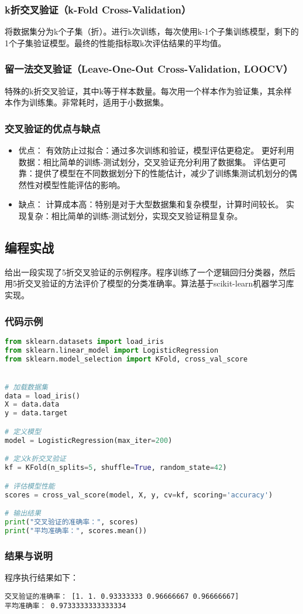 \subsubsection{k折交叉验证（k-Fold Cross-Validation）}

将数据集分为k个子集（折）。进行k次训练，每次使用k-1个子集训练模型，剩下的1个子集验证模型。最终的性能指标取k次评估结果的平均值。

\subsubsection{留一法交叉验证（Leave-One-Out Cross-Validation, LOOCV）}

特殊的k折交叉验证，其中k等于样本数量。每次用一个样本作为验证集，其余样本作为训练集。非常耗时，适用于小数据集。

\subsubsection{交叉验证的优点与缺点}
\begin{itemize}
\item 优点：
有效防止过拟合：通过多次训练和验证，模型评估更稳定。
更好利用数据：相比简单的训练-测试划分，交叉验证充分利用了数据集。
评估更可靠：提供了模型在不同数据划分下的性能估计，减少了训练集测试机划分的偶然性对模型性能评估的影响。
\item 缺点：
计算成本高：特别是对于大型数据集和复杂模型，计算时间较长。
实现复杂：相比简单的训练-测试划分，实现交叉验证稍显复杂。
\end{itemize}

\subsection{编程实战}

给出一段实现了5折交叉验证的示例程序。程序训练了一个逻辑回归分类器，然后用5折交叉验证的方法评价了模型的分类准确率。算法基于scikit-learn机器学习库实现。

\subsubsection{代码示例}
\begin{lstlisting}[language=python]
from sklearn.datasets import load_iris
from sklearn.linear_model import LogisticRegression
from sklearn.model_selection import KFold, cross_val_score


# 加载数据集
data = load_iris()
X = data.data
y = data.target

# 定义模型
model = LogisticRegression(max_iter=200)

# 定义k折交叉验证
kf = KFold(n_splits=5, shuffle=True, random_state=42)

# 评估模型性能
scores = cross_val_score(model, X, y, cv=kf, scoring='accuracy')

# 输出结果
print("交叉验证的准确率：", scores)
print("平均准确率：", scores.mean())
\end{lstlisting}


\subsubsection{结果与说明}
程序执行结果如下：
\begin{lstlisting}[language=none]
交叉验证的准确率： [1. 1. 0.93333333 0.96666667 0.96666667]
平均准确率： 0.9733333333333334
\end{lstlisting}
